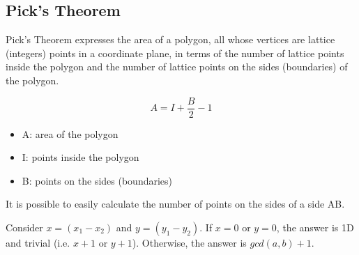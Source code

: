 \subsection{Pick's Theorem}

Pick's Theorem expresses the area of a polygon, all whose vertices are lattice (integers) points in a coordinate plane, in terms of the number of lattice points inside the polygon and the number of lattice points on the sides (boundaries) of the polygon.

\[A = I + \frac{B}{2} - 1\]

\begin{itemize}
    \item A: area of the polygon
    \item I: points inside the polygon
    \item B: points on the sides (boundaries)
\end{itemize}

It is possible to easily calculate the number of points on the sides of a side AB.

Consider \(x = (x_1 - x_2)\) and \(y = (y_1 - y_2)\).
If \(x = 0\) or \(y = 0\), the answer is 1D and trivial (i.e. \(x + 1\) or \(y + 1\)). Otherwise, the answer is \(gcd(a, b) + 1\).
